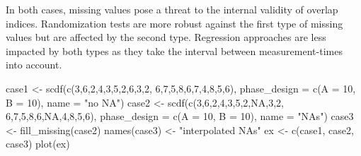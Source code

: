 \documentclass[
  letterpaper,
  DIV=11,
  numbers=noendperiod]{scrreprt}
\newenvironment{Shaded}{\begin{snugshade}}{\end{snugshade}}
\newcommand{\AttributeTok}[1]{\textcolor[rgb]{0.40,0.45,0.13}{#1}}
\newcommand{\ConstantTok}[1]{\textcolor[rgb]{0.56,0.35,0.01}{#1}}
\newcommand{\DecValTok}[1]{\textcolor[rgb]{0.68,0.00,0.00}{#1}}
\newcommand{\FunctionTok}[1]{\textcolor[rgb]{0.28,0.35,0.67}{#1}}
\newcommand{\NormalTok}[1]{\textcolor[rgb]{0.00,0.23,0.31}{#1}}
\newcommand{\OtherTok}[1]{\textcolor[rgb]{0.00,0.23,0.31}{#1}}
\newcommand{\StringTok}[1]{\textcolor[rgb]{0.13,0.47,0.30}{#1}}
\begin{document}
In both cases, missing values pose a threat to the internal validity of
overlap indices. Randomization tests are more robust against the first
type of missing values but are affected by the second type. Regression
approaches are less impacted by both types as they take the interval
between measurement-times into account.

\begin{Shaded}
\begin{Highlighting}[]
\NormalTok{case1 }\OtherTok{\textless{}{-}} \FunctionTok{scdf}\NormalTok{(}\FunctionTok{c}\NormalTok{(}\DecValTok{3}\NormalTok{,}\DecValTok{6}\NormalTok{,}\DecValTok{2}\NormalTok{,}\DecValTok{4}\NormalTok{,}\DecValTok{3}\NormalTok{,}\DecValTok{5}\NormalTok{,}\DecValTok{2}\NormalTok{,}\DecValTok{6}\NormalTok{,}\DecValTok{3}\NormalTok{,}\DecValTok{2}\NormalTok{, }\DecValTok{6}\NormalTok{,}\DecValTok{7}\NormalTok{,}\DecValTok{5}\NormalTok{,}\DecValTok{8}\NormalTok{,}\DecValTok{6}\NormalTok{,}\DecValTok{7}\NormalTok{,}\DecValTok{4}\NormalTok{,}\DecValTok{8}\NormalTok{,}\DecValTok{5}\NormalTok{,}\DecValTok{6}\NormalTok{), }
              \AttributeTok{phase\_design =} \FunctionTok{c}\NormalTok{(}\AttributeTok{A =} \DecValTok{10}\NormalTok{, }\AttributeTok{B =} \DecValTok{10}\NormalTok{), }\AttributeTok{name =} \StringTok{"no NA"}\NormalTok{)}
\NormalTok{case2 }\OtherTok{\textless{}{-}} \FunctionTok{scdf}\NormalTok{(}\FunctionTok{c}\NormalTok{(}\DecValTok{3}\NormalTok{,}\DecValTok{6}\NormalTok{,}\DecValTok{2}\NormalTok{,}\DecValTok{4}\NormalTok{,}\DecValTok{3}\NormalTok{,}\DecValTok{5}\NormalTok{,}\DecValTok{2}\NormalTok{,}\ConstantTok{NA}\NormalTok{,}\DecValTok{3}\NormalTok{,}\DecValTok{2}\NormalTok{, }\DecValTok{6}\NormalTok{,}\DecValTok{7}\NormalTok{,}\DecValTok{5}\NormalTok{,}\DecValTok{8}\NormalTok{,}\DecValTok{6}\NormalTok{,}\ConstantTok{NA}\NormalTok{,}\DecValTok{4}\NormalTok{,}\DecValTok{8}\NormalTok{,}\DecValTok{5}\NormalTok{,}\DecValTok{6}\NormalTok{), }
              \AttributeTok{phase\_design =} \FunctionTok{c}\NormalTok{(}\AttributeTok{A =} \DecValTok{10}\NormalTok{, }\AttributeTok{B =} \DecValTok{10}\NormalTok{), }\AttributeTok{name =} \StringTok{"NAs"}\NormalTok{)}
\NormalTok{case3 }\OtherTok{\textless{}{-}} \FunctionTok{fill\_missing}\NormalTok{(case2)}
\FunctionTok{names}\NormalTok{(case3) }\OtherTok{\textless{}{-}} \StringTok{"interpolated NAs"}
\NormalTok{ex }\OtherTok{\textless{}{-}} \FunctionTok{c}\NormalTok{(case1, case2, case3)}
\FunctionTok{plot}\NormalTok{(ex)}
\end{Highlighting}
\end{Shaded}
\end{document}
